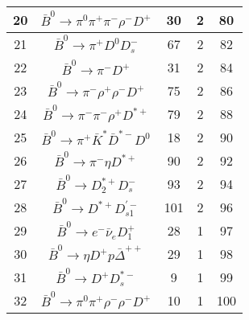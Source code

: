 \documentclass[landscape]{article}
\begin{document}
\begin{table}[htbp!]
\begin{tabular}{|c|c|c|c|c|}
\hline
20 & $ \bar{B}^{0} \rightarrow \pi^{0} \pi^{+} \pi^{-} \rho^{-} D^{+} $ & 30 & 2 & 80 \\
\hline
21 & $ \bar{B}^{0} \rightarrow \pi^{+} D^{0} D_{s}^{-} $ & 67 & 2 & 82 \\
\hline
22 & $ \bar{B}^{0} \rightarrow \pi^{-} D^{+} $ & 31 & 2 & 84 \\
\hline
23 & $ \bar{B}^{0} \rightarrow \pi^{-} \rho^{+} \rho^{-} D^{+} $ & 75 & 2 & 86 \\
\hline
24 & $ \bar{B}^{0} \rightarrow \pi^{-} \pi^{-} \rho^{+} D^{*+} $ & 79 & 2 & 88 \\
\hline
25 & $ \bar{B}^{0} \rightarrow \pi^{+} \bar{K}^{*} \bar{D}^{*-} D^{0} $ & 18 & 2 & 90 \\
\hline
26 & $ \bar{B}^{0} \rightarrow \pi^{-} \eta D^{*+} $ & 90 & 2 & 92 \\
\hline
27 & $ \bar{B}^{0} \rightarrow D_{2}^{*+} D_{s}^{-} $ & 93 & 2 & 94 \\
\hline
28 & $ \bar{B}^{0} \rightarrow D^{*+} D_{s1}^{\prime-} $ & 101 & 2 & 96 \\
\hline
29 & $ \bar{B}^{0} \rightarrow e^{-} \bar{\nu}_{e} D_{1}^{+} $ & 28 & 1 & 97 \\
\hline
30 & $ \bar{B}^{0} \rightarrow \eta D^{+} p \bar{\Delta}^{++} $ & 29 & 1 & 98 \\
\hline
31 & $ \bar{B}^{0} \rightarrow D^{+} D_{s}^{*-} $ & 9 & 1 & 99 \\
\hline
32 & $ \bar{B}^{0} \rightarrow \pi^{0} \pi^{+} \rho^{-} \rho^{-} D^{+} $ & 10 & 1 & 100 \\
\hline
\end{tabular}
\end{table}

\clearpage
\end{document}
